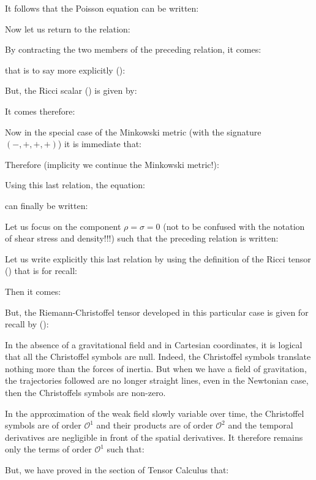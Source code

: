 	It follows that the Poisson equation can be written:
	
	Now let us return to the relation:
	
	By contracting the two members of the preceding relation, it comes:
	
	that is to say more explicitly ():
	
	But, the Ricci scalar () is given by:
	
	It comes therefore:
	
	Now in the special case of the Minkowski metric (with the signature $(-, +, +, +)$) it is immediate that:
	
	Therefore (implicity we continue the Minkowski metric!):
	
	Using this last relation, the equation:
	
	can finally be written:
	
	Let us focus on the component $\rho=\sigma=0$ (not to be confused with the notation of shear stress and density!!!) such that the preceding relation is written:
	
	Let us write explicitly this last relation by using the definition of the Ricci tensor () that is for recall:
	
	Then it comes:
	
	But, the Riemann-Christoffel tensor developed in this particular case is given for recall by ():
	
	\begin{tcolorbox}[title=Remark,colframe=black,arc=10pt]
	In the absence of a gravitational field and in Cartesian coordinates, it is logical that all the Christoffel symbols are null. Indeed, the Christoffel symbols translate nothing more than the forces of inertia. But when we have a field of gravitation, the trajectories followed are no longer straight lines, even in the Newtonian case, then the Christoffels symbols are non-zero.
	\end{tcolorbox}
	In the approximation of the weak field slowly variable over time, the Christoffel symbols are of order $\mathcal{O}^1$ and their products are of order $\mathcal{O}^2$ and the temporal derivatives are negligible in front of the spatial derivatives. It therefore remains only the terms of order $\mathcal{O}^1$ such that:
	
	But, we have proved in the section of Tensor Calculus that:
	
